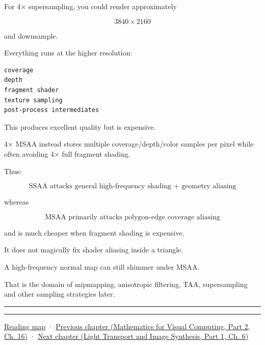 For 4× supersampling, you could render approximately

\[
3840\times2160
\]

and downsample.

Everything runs at the higher resolution:

\begin{verbatim}
coverage
depth
fragment shader
texture sampling
post-process intermediates
\end{verbatim}

This produces excellent quality but is expensive.

4× MSAA instead stores multiple coverage/depth/color samples per pixel while often avoiding 4× full fragment shading.

Thus:

\[
\boxed{
\text{SSAA attacks general high-frequency shading + geometry aliasing}
}
\]

whereas

\[
\boxed{
\text{MSAA primarily attacks polygon-edge coverage aliasing}
}
\]

and is much cheaper when fragment shading is expensive.

It does not magically fix shader aliasing inside a triangle.

A high-frequency normal map can still shimmer under MSAA.

That is the domain of mipmapping, anisotropic filtering, TAA, supersampling and other sampling strategies later.

\begin{center}\rule{0.5\linewidth}{0.5pt}\end{center}

\begin{center}\rule{0.5\linewidth}{0.5pt}\end{center}

\hyperref[volume-reading-map]{Reading map} · \href{../02-Mathematics-for-Visual-Computing-P02/main.pdf\#nameddest=03-visual-computing-i-ch012-probability-statistics-and-uncertainty}{Previous chapter (Mathematics for Visual Computing, Part 2, Ch. 16)} · \href{../04-Light-Transport-and-Image-Synthesis-P01/main.pdf\#nameddest=03-visual-computing-i-ch014-transparency-blending-and-visibility}{Next chapter (Light Transport and Image Synthesis, Part 1, Ch. 6)}
